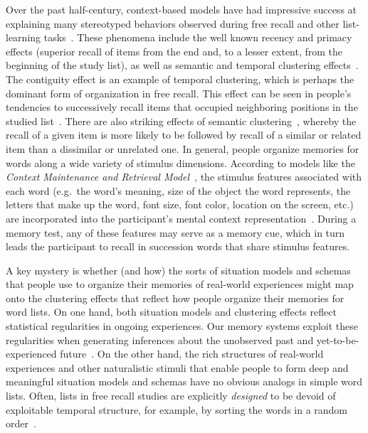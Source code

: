 \documentclass[11pt]{article}
\begin{document}
Over the past half-century, context-based models have had impressive success at
explaining many stereotyped behaviors observed during free recall and other
list-learning tasks~\citep{Este55a, RaaiShif80, GlenEtal83, HowaKaha02a,
SiroEtal05, KimbEtal07, PolyKaha08, SedeEtal08, PolyEtal09, ShanHowa12}. These
phenomena include the well known recency and primacy effects (superior recall
of items from the end and, to a lesser extent, from the beginning of the study
list), as well as semantic and temporal clustering effects~\citep{KahaEtal08b,
HowaKaha02b}. The contiguity effect is an example of temporal clustering, which
is perhaps the dominant form of organization in free recall. This effect can be
seen in people's tendencies to successively recall items that occupied
neighboring positions in the studied list~\citep{Kaha96}. There are also
striking effects of semantic clustering~\citep{RomnEtal93, Bous53, BousEtal54,
JenkRuss52, MannKaha12}, whereby the recall of a given item is more likely to
be followed by recall of a similar or related item than a dissimilar or
unrelated one. In general, people organize memories for words along a wide
variety of stimulus dimensions. According to models like the
\textit{Context Maintenance and Retrieval Model}~\citep{PolyEtal09}, the
stimulus features associated with each word (e.g.\ the word's meaning, size of
the object the word represents, the letters that make up the word, font size,
font color, location on the screen, etc.) are incorporated into the
participant's mental context representation~\citep{SmitVela01, MannEtal11,
MannEtal12, MannEtal15, Mann20}. During a memory test, any of these features
may serve as a memory cue, which in turn leads the participant to recall in
succession words that share stimulus features.


A key mystery is whether (and how) the sorts of situation models and schemas
that people use to organize their memories of real-world experiences might map
onto the clustering effects that reflect how people organize their memories for
word lists. On one hand, both situation models and clustering effects reflect
statistical regularities in ongoing experiences. Our memory systems exploit
these regularities when generating inferences about the unobserved past and
yet-to-be-experienced future~\citep{XuEtal23, SchaTurk15, RangRitc12,
BoweEtal79, MomeEtal17}. On the other hand, the rich structures of real-world
experiences and other naturalistic stimuli that enable people to form deep and
meaningful situation models and schemas have no obvious analogs in simple word
lists. Often, lists in free recall studies are explicitly \textit{designed} to
be devoid of exploitable temporal structure, for example, by sorting the words
in a random order~\citep{Kaha12}.
\end{document}
